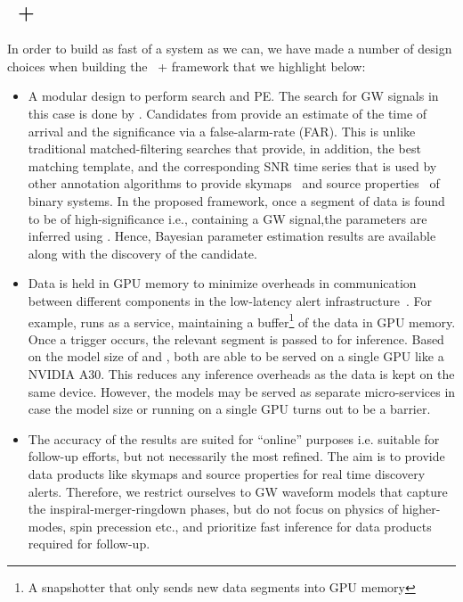 \begin{refsection}
\section{\aframe~+ \amplfi}\label{amp_meth_sec:philosophy}
In order to build as fast of a system as we can, we have made a number of design choices  when building the {\aframe~+ \amplfi} framework that we highlight below:
\begin{itemize}
    \item A modular design to perform search and PE. The search for GW signals in this case is done by {\aframe}.
          Candidates from {\aframe} provide an estimate of the time of arrival and the significance via a false-alarm-rate (FAR).
          This is unlike traditional matched-filtering searches that provide, in addition, the best matching template, and the corresponding SNR time series that is used by other annotation algorithms to provide skymaps~\cite{Singer_2016} and source properties~\cite{Chatterjee:2019avs} of binary systems.
          In the proposed framework, once a segment of data is found to be of high-significance i.e., containing a GW signal,the parameters are inferred using {\amplfi}. 
          Hence, Bayesian parameter estimation results are available
          along with the discovery of the candidate.
    \item Data is held in GPU memory to minimize overheads in communication between different components in the low-latency alert infrastructure~\cite{Chaudhary_2024}. 
          For example, {\aframe} runs as a service, maintaining a buffer\footnote{A snapshotter that only sends new data segments into GPU memory} of the data in GPU
          memory. 
          Once a trigger occurs, the relevant segment is passed to {\amplfi} for inference. 
          Based on the model size of {\aframe} and {\amplfi}, both are able to be served on a single GPU like a NVIDIA A30. 
          This reduces any inference overheads as the data is kept on the same device.
          However, the models may be served as separate micro-services in case the model size or running on a single GPU turns out to be a barrier.
    \item The accuracy of the results are suited for ``online'' purposes i.e. suitable for follow-up efforts, but not necessarily the most refined. 
    The aim is to provide data products like skymaps and source properties for real time discovery alerts. 
    Therefore, we restrict ourselves to GW waveform models that capture the inspiral-merger-ringdown phases, but do not focus on physics of higher-modes, spin precession etc., and prioritize fast inference for data products required for follow-up.
\end{itemize}


\end{refsection}
